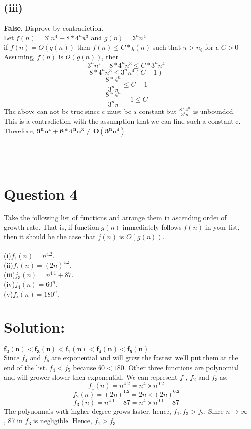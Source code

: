 \documentclass[12pt, a4paper]{article}
\begin{document}
\subsection*{(iii)} \textbf{False}. Disprove by contradiction.
\\ Let $f(n) = 3^{n}n^{4} + 8 * 4^{n}n^{3}$ and $g(n) = 3^{n}n^{4}$ \\ if $f(n) = O(g(n))$ then $f(n) \leq C * g(n)$ such that $n>n_0$ for a $C>0$
	\\Assuming, $f(n)$ is $O(g(n))$, then $$ 3^{n}n^{4} + 8 * 4^{n}n^{3} \leq C * 3^{n}n^{4} $$ $$ 8 * 4^{n}n^{3} \leq  3^{n}n^{4}(C - 1)$$ $$\frac{8 * 4^{n}}{3^{n}n} \leq C - 1 $$ $$ \frac{8 * 4^{n}}{3^{n}n} + 1 \leq C $$
The above can not be true since c must be a constant but $ \frac{8 * 4^{n}}{3^{n}n}$ is unbounded. This is a contradiction with the assumption that we can find such a constant c. Therefore, $\bm{3^{n}n^{4} + 8 * 4^{n}n^{3} \neq O(3^{n}n^{4})}$\\\\\\\\



\section*{Question 4}
Take the following list of functions and arrange them in ascending order of growth rate.  That is, if function $g(n)$ immediately follows $f(n)$ in your list, then it should be the case that $f(n)$ is $O(g(n))$.\\
\\(i)$f_1(n) =n^{4.2}$.
\\(ii)$f_2(n) = (2n)^{1.2}$.
\\(iii)$f_3(n) =n^{4.1}+ 87$.
\\(iv)$f_4(n) = 60^{n}$.
\\(v)$f_5(n) = 180^{n}$.
\section*{Solution:}
$\bm{f_2(n) < f_3(n) < f_1(n) < f_4(n) < f_5(n)}$
\\Since $f_4$ and $f_5$ are exponential and will grow the fastest we'll put them at the end of the list. $f_4 < f_5$ because $60 < 180$. Other three functions are polynomial and will grower slower then exponential. We can represent $f_1$, $f_2$ and $f_3$ as: $$ f_1(n) =n^{4.2} = n^{4} \times n^{0.2} $$ $$ f_2(n) =(2n)^{1.2} = 2n \times (2n)^{0.2} $$
 $$ f_3(n) =n^{4.1} + 87 = n^{4} \times n^{0.1} + 87$$ The polynomials with higher degree grows faster. hence, $f_1, f_3 > f_2$. Since $n \to \infty$, 87 in $f_3$ is negligible. Hence, $f_1 > f_3$
\end{document}
